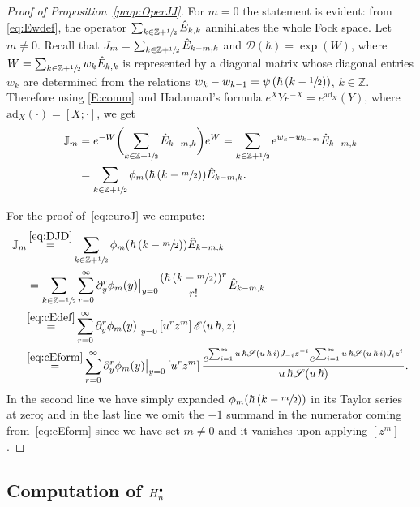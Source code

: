 \documentclass[11pt]{article}
\let\mathcal\mathscr
\newcommand{\sbullet}{{\scriptscriptstyle\bullet}}
\newcommand{\csbullet}{{\raisebox{1pt}{$\sbullet$}}}
\theoremstyle{plain}
\theoremstyle{definition}
\theoremstyle{remark}
\newcommand{\Z}{\mathbb{Z}}
\newcommand{\cS}{\mathcal{S}}
\newcommand{\cE}{\mathcal{E}}
\newcommand{\Hd}{H^\csbullet}
\newcommand{\euro}{\mathbb{J}}
\begin{document}
\begin{proof}[Proof of Proposition~\ref{prop:OperJJ}] For $m=0$ the statement is evident: from \eqref{eq:Ewdef}, the operator $\sum_{k\in\Z+\sfrac{1}{2}}\hat E_{k,k}$ annihilates the whole Fock space. Let $m\neq 0$. Recall that $J_m=\sum_{k\in\Z+\sfrac{1}{2}}\hat{E}_{k-m,k}$ and
$
\mathcal{D}(\hbar)=\exp(W)
$,
where $W=\sum_{k\in \Z+\sfrac{1}{2}}w_k \hat E_{k,k}$ is represented by a diagonal matrix whose diagonal entries $w_k$ are determined from the relations
$w_{k}-w_{k-1}=\psi\left(\hbar\,(k-\sfrac{1}{2})\right)$, $k\in\Z$.
Therefore
using \eqref{E:comm} and Hadamard's formula $e^XY e^{-X} = e^{\mathrm{ad}_X}(Y)$, where $\mathrm{ad}_X(\cdot) =[X;\cdot]$, we get
\begin{align*}
\euro_m & =e^{-W}\biggl(\sum_{k\in\Z+\sfrac{1}{2}}\hat{E}_{k-m,k}\biggr) e^{W}
=\sum_{k\in\Z+\sfrac{1}{2}}e^{w_k-w_{k-m}}\hat{E}_{k-m,k}
\\
& =\sum_{k\in\Z+\sfrac{1}{2}}\phi_m(\hbar\,(k-\sfrac m2))\hat{E}_{k-m,k}.
\end{align*}

For the proof of~\eqref{eq:euroJ} we compute:
\begin{align*}
\euro_m
&\mathop{=}^{\eqref{eq:DJD}}
\sum_{k\in\Z+\sfrac{1}{2}}\phi_m(\hbar\,(k-\sfrac m2))\hat{E}_{k-m,k}
\\
&=
\sum_{k\in\Z+\sfrac{1}{2}}\sum_{r=0}^\infty\partial_y^r\phi_m(y)\big|_{y=0}
\frac{(\hbar\,(k-\sfrac m2))^r}{r!}\hat{E}_{k-m,k}
\\
&\!\mathop{=}^{\eqref{eq:cEdef}}
\sum_{r=0}^\infty\partial_y^r\phi_m(y)\big|_{y=0}\,[u^rz^m]\,\cE(u\,\hbar,z)
\\
&\!\mathop{=}^{\eqref{eq:cEform}}
\sum_{r=0}^\infty\partial_y^r\phi_m(y)\big|_{y=0}\,[u^rz^m]\,
\frac{
e^{\sum_{i=1}^\infty u\,\hbar\cS(u\,\hbar\,i) J_{-i}z^{-i}}
e^{\sum_{i=1}^\infty u\,\hbar \cS(u\,\hbar\,i) J_{i}z^{i}}}
{u\,\hbar\cS(u\,\hbar)}.
\end{align*}
In the second line we have simply expanded $\phi_m(\hbar\,(k-\sfrac m2))$ in its Taylor series at zero; and in the last line we omit the $-1$ summand in the numerator coming from~\eqref{eq:cEform} since we have set $m\neq 0$ and it vanishes upon applying $[z^m]$.
\end{proof}

\subsection{Computation of \texorpdfstring{$\Hd_n$}{Hn disconnected}}
\end{document}
